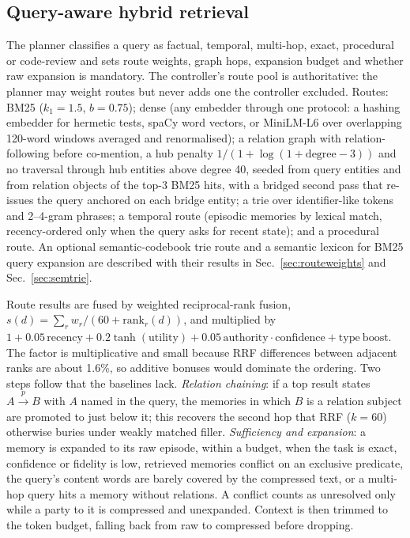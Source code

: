\documentclass[journal]{IEEEtran}
\begin{document}
\subsection{Query-aware hybrid retrieval}
\label{sec:retrieval}
The planner classifies a query as factual, temporal, multi-hop, exact, procedural or code-review and sets route weights, graph hops, expansion budget and whether raw expansion is mandatory. The controller's route pool is authoritative: the planner may weight routes but never adds one the controller excluded. Routes: BM25 ($k_1 = 1.5$, $b = 0.75$); dense (any embedder through one protocol: a hashing embedder for hermetic tests, spaCy word vectors, or MiniLM-L6 over overlapping 120-word windows averaged and renormalised); a relation graph with relation-following before co-mention, a hub penalty $1/(1 + \log(1 + \mathrm{degree} - 3))$ and no traversal through hub entities above degree 40, seeded from query entities and from relation objects of the top-3 BM25 hits, with a bridged second pass that re-issues the query anchored on each bridge entity; a trie over identifier-like tokens and 2--4-gram phrases; a temporal route (episodic memories by lexical match, recency-ordered only when the query asks for recent state); and a procedural route. An optional semantic-codebook trie route and a semantic lexicon for BM25 query expansion are described with their results in Sec.~\ref{sec:routeweights} and Sec.~\ref{sec:semtrie}.

Route results are fused by weighted reciprocal-rank fusion, $s(d) = \sum_r w_r/(60 + \mathrm{rank}_r(d))$, and multiplied by $1 + 0.05\,\mathrm{recency} + 0.2\tanh(\mathrm{utility}) + 0.05\,\mathrm{authority}\cdot\mathrm{confidence} + \mathrm{type\ boost}$. The factor is multiplicative and small because RRF differences between adjacent ranks are about 1.6\%, so additive bonuses would dominate the ordering. Two steps follow that the baselines lack. \emph{Relation chaining}: if a top result states $A \xrightarrow{p} B$ with $A$ named in the query, the memories in which $B$ is a relation subject are promoted to just below it; this recovers the second hop that RRF ($k = 60$) otherwise buries under weakly matched filler. \emph{Sufficiency and expansion}: a memory is expanded to its raw episode, within a budget, when the task is exact, confidence or fidelity is low, retrieved memories conflict on an exclusive predicate, the query's content words are barely covered by the compressed text, or a multi-hop query hits a memory without relations. A conflict counts as unresolved only while a party to it is compressed and unexpanded. Context is then trimmed to the token budget, falling back from raw to compressed before dropping.
\end{document}
